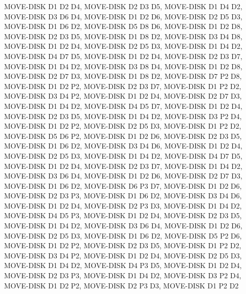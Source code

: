 \documentclass[12pt]{article}
\begin{document}
\begin{appendix}
\begin{itemize}
MOVE-DISK D1 D2 D4,  MOVE-DISK D2 D3 D5,  MOVE-DISK D1 D4 D2,  MOVE-DISK D3 D6 D4,  MOVE-DISK D1 D2 D6,  MOVE-DISK D2 D5 D3,  MOVE-DISK D1 D6 D2,  MOVE-DISK D5 D8 D6,  MOVE-DISK D1 D2 D8,  MOVE-DISK D2 D3 D5,  MOVE-DISK D1 D8 D2,  MOVE-DISK D3 D4 D8,  MOVE-DISK D1 D2 D4,  MOVE-DISK D2 D5 D3,  MOVE-DISK D1 D4 D2,  MOVE-DISK D4 D7 D5,  MOVE-DISK D1 D2 D4,  MOVE-DISK D2 D3 D7,  MOVE-DISK D1 D4 D2,  MOVE-DISK D3 D8 D4,  MOVE-DISK D1 D2 D8,  MOVE-DISK D2 D7 D3,  MOVE-DISK D1 D8 D2,  MOVE-DISK D7 P2 D8,  MOVE-DISK D1 D2 P2,  MOVE-DISK D2 D3 D7,  MOVE-DISK D1 P2 D2,  MOVE-DISK D3 D4 P2,  MOVE-DISK D1 D2 D4,  MOVE-DISK D2 D7 D3,  MOVE-DISK D1 D4 D2,  MOVE-DISK D4 D5 D7,  MOVE-DISK D1 D2 D4,  MOVE-DISK D2 D3 D5,  MOVE-DISK D1 D4 D2,  MOVE-DISK D3 P2 D4,  MOVE-DISK D1 D2 P2,  MOVE-DISK D2 D5 D3,  MOVE-DISK D1 P2 D2,  MOVE-DISK D5 D6 P2,  MOVE-DISK D1 D2 D6,  MOVE-DISK D2 D3 D5,  MOVE-DISK D1 D6 D2,  MOVE-DISK D3 D4 D6,  MOVE-DISK D1 D2 D4,  MOVE-DISK D2 D5 D3,  MOVE-DISK D1 D4 D2,  MOVE-DISK D4 D7 D5,  MOVE-DISK D1 D2 D4,  MOVE-DISK D2 D3 D7,  MOVE-DISK D1 D4 D2,  MOVE-DISK D3 D6 D4,  MOVE-DISK D1 D2 D6,  MOVE-DISK D2 D7 D3,  MOVE-DISK D1 D6 D2,  MOVE-DISK D6 P3 D7,  MOVE-DISK D1 D2 D6,  MOVE-DISK D2 D3 P3,  MOVE-DISK D1 D6 D2,  MOVE-DISK D3 D4 D6,  MOVE-DISK D1 D2 D4,  MOVE-DISK D2 P3 D3,  MOVE-DISK D1 D4 D2,  MOVE-DISK D4 D5 P3,  MOVE-DISK D1 D2 D4,  MOVE-DISK D2 D3 D5,  MOVE-DISK D1 D4 D2,  MOVE-DISK D3 D6 D4,  MOVE-DISK D1 D2 D6,  MOVE-DISK D2 D5 D3,  MOVE-DISK D1 D6 D2,  MOVE-DISK D5 P2 D6,  MOVE-DISK D1 D2 P2,  MOVE-DISK D2 D3 D5,  MOVE-DISK D1 P2 D2,  MOVE-DISK D3 D4 P2,  MOVE-DISK D1 D2 D4,  MOVE-DISK D2 D5 D3,  MOVE-DISK D1 D4 D2,  MOVE-DISK D4 P3 D5,  MOVE-DISK D1 D2 D4,  MOVE-DISK D2 D3 P3,  MOVE-DISK D1 D4 D2,  MOVE-DISK D3 P2 D4,  MOVE-DISK D1 D2 P2,  MOVE-DISK D2 P3 D3,  MOVE-DISK D1 P2 D2
  
  \end{itemize}

\end{appendix}

\newpage
\end{document}
